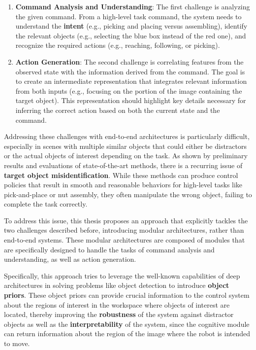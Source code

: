 \begin{enumerate}
    \item \textbf{Command Analysis and Understanding}: The first challenge is analyzing the given command. From a high-level task command, the system needs to understand the \textbf{intent} (e.g., picking and placing versus assembling), identify the relevant objects (e.g., selecting the blue box instead of the red one), and recognize the required actions (e.g., reaching, following, or picking).

    \item \textbf{Action Generation}: The second challenge is correlating features from the observed state with the information derived from the command. The goal is to create an intermediate representation that integrates relevant information from both inputs (e.g., focusing on the portion of the image containing the target object). This representation should highlight key details necessary for inferring the correct action based on both the current state and the command.
\end{enumerate}

Addressing these challenges with end-to-end architectures is particularly difficult, especially in scenes with multiple similar objects that could either be distractors or the actual objects of interest depending on the task. As shown by preliminary results and evaluations of state-of-the-art methods, there is a recurring issue of \textbf{target object misidentification}. While these methods can produce control policies that result in smooth and reasonable behaviors for high-level tasks like pick-and-place or nut assembly, they often manipulate the wrong object, failing to complete the task correctly.

To address this issue, this thesis proposes an approach that explicitly tackles the two challenges described before, introducing modular architectures, rather than end-to-end systems. These modular architectures are composed of modules that are specifically designed to handle the tasks of command analysis and understanding, as well as action generation.

Specifically, this approach tries to leverage the well-known capabilities of deep architectures in solving problems like object detection to introduce \textbf{object priors}. These object priors can provide crucial information to the control system about the regions of interest in the workspace where objects of interest are located, thereby improving the \textbf{robustness} of the system against distractor objects as well as the \textbf{interpretability} of the system, since the cognitive module can return information about the region of the image where the robot is intended to move.

